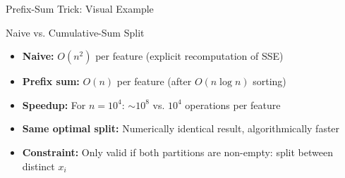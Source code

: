 \documentclass[11pt,compress,t,notes=noshow, aspectratio=169, xcolor=table]{beamer}
\begin{document}
\begin{frame}{Prefix-Sum Trick: Visual Example}

\end{frame}


\begin{frame}{Naive vs. Cumulative-Sum Split}
  \begin{itemize}
    \item \textbf{Naive:} $O(n^2)$ per feature (explicit recomputation of SSE)
    \item \textbf{Prefix sum:} $O(n)$ per feature (after $O(n \log n)$ sorting)
    \item \textbf{Speedup:} For $n = 10^4$: $\sim10^8$ vs. $10^4$ operations per feature
    \item \textbf{Same optimal split:} Numerically identical result, algorithmically faster
    \item \textbf{Constraint:} Only valid if both partitions are non-empty: split between distinct $x_i$
  \end{itemize}
\end{frame}
\end{document}
